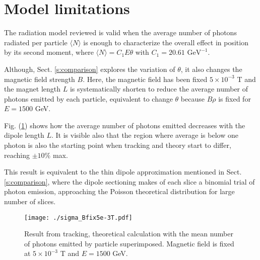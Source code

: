 \section{Model limitations}\label{s:modellim}
The radiation model reviewed is valid when the average number of photons radiated per particle $\langle N\rangle$ is enough to characterize the overall effect in position by its second moment, where $\langle N\rangle  = C_1E\theta$ with $C_1=20.61\text{ GeV}^{-1}$.\par
Although, Sect. \ref{s:comparison} explores the variation of $\theta$, it also changes the magnetic field strength $B$. Here, the magnetic field has been fixed $5 \times 10^{-3}$ T and the magnet length $L$ is systematically shorten to reduce the average number of photons emitted by each particle, equivalent to change $\theta$ because $B\rho$ is fixed for $E=1500$ GeV.\par
Fig. (\ref{figPhotons}) shows how the average number of photons emitted decreases with the dipole length $L$. It is visible also that the region where average is below one photon is also the starting point when tracking and theory start to differ, reaching $\pm10\%$ max.\par
This result is equivalent to the thin dipole approximation mentioned in Sect. \ref{s:comparison}, where the dipole sectioning makes of each slice a binomial trial of photon emission, approaching the Poisson theoretical distribution for large number of slices.\par
\begin{figure}[htb]
\centering
\texttt{[image: ./sigma\_Bfix5e-3T.pdf]} \caption{Result from tracking, theoretical calculation with the mean number of photons emitted by particle superimposed. Magnetic field is fixed at $5\times 10^{-3}$ T and $E=1500$  GeV.}\label{figPhotons}
\end{figure}

